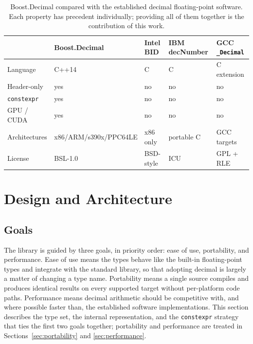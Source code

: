 \documentclass[acmsmall]{acmart}
\begin{document}
\begin{table}
  \caption{Boost.Decimal compared with the established decimal floating-point
    software. Each property has precedent individually; providing all of them
    together is the contribution of this work.}
  \label{tab:comparison}
  \footnotesize
  \begin{tabular}{lllll}
    \toprule
     & \textbf{Boost.Decimal} & \textbf{Intel BID} & \textbf{IBM decNumber} & \textbf{GCC \texttt{\_Decimal}} \\
    \midrule
    Language           & C++14                 & C          & C           & C extension \\
    Header-only        & yes                   & no         & no          & no \\
    \texttt{constexpr} & yes                   & no         & no          & no \\
    GPU / CUDA         & yes                   & no         & no          & no \\
    Architectures      & x86/ARM/s390x/PPC64LE & x86 only   & portable C  & GCC targets \\
    License            & BSL-1.0               & BSD-style  & ICU         & GPL + RLE \\
    \bottomrule
  \end{tabular}
\end{table}

\section{Design and Architecture}
\label{sec:design}

\subsection{Goals}
The library is guided by three goals, in priority order: ease of use, portability, and
performance. Ease of use means the types behave like the built-in floating-point types
and integrate with the standard library, so that adopting decimal is largely a matter
of changing a type name. Portability means a single source compiles and produces
identical results on every supported target without per-platform code paths.
Performance means decimal arithmetic should be competitive with, and where possible
faster than, the established software implementations. This section describes the type
set, the internal representation, and the \texttt{constexpr} strategy that ties the
first two goals together; portability and performance are treated in
Sections~\ref{sec:portability} and \ref{sec:performance}.
\end{document}
